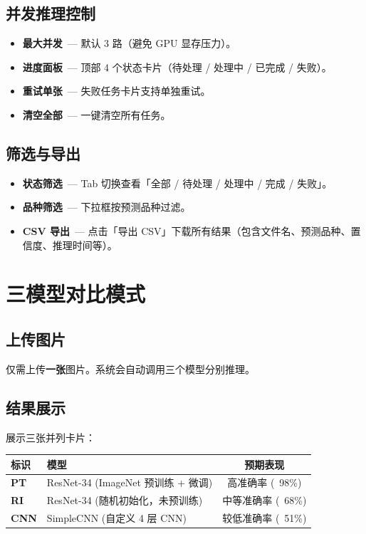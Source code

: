 \documentclass[12pt, a4paper, openany]{ctexbook}
\begin{document}
\subsection{并发推理控制}

\begin{itemize}
  \item \textbf{最大并发}\ — 默认 3 路（避免 GPU 显存压力）。
  \item \textbf{进度面板}\ — 顶部 4 个状态卡片（待处理 / 处理中 / 已完成 / 失败）。
  \item \textbf{重试单张}\ — 失败任务卡片支持单独重试。
  \item \textbf{清空全部}\ — 一键清空所有任务。
\end{itemize}

\subsection{筛选与导出}

\begin{itemize}
  \item \textbf{状态筛选}\ — Tab 切换查看「全部 / 待处理 / 处理中 / 完成 / 失败」。
  \item \textbf{品种筛选}\ — 下拉框按预测品种过滤。
  \item \textbf{CSV 导出}\ — 点击「导出 CSV」下载所有结果（包含文件名、预测品种、置信度、推理时间等）。
\end{itemize}

\section{三模型对比模式}

\subsection{上传图片}

仅需上传\textbf{一张}图片。系统会自动调用三个模型分别推理。

\subsection{结果展示}

展示三张并列卡片：

\begin{center}
\begin{tabular}{lL{6cm}c}
  \toprule
  \textbf{标识} & \textbf{模型} & \textbf{预期表现} \\
  \midrule
  \textbf{PT}  & ResNet-34 (ImageNet 预训练 + 微调)  & 高准确率 (~98\%) \\
  \textbf{RI}  & ResNet-34 (随机初始化，未预训练)    & 中等准确率 (~68\%) \\
  \textbf{CNN} & SimpleCNN (自定义 4 层 CNN)         & 较低准确率 (~51\%) \\
  \bottomrule
\end{tabular}
\end{center}
\end{document}
